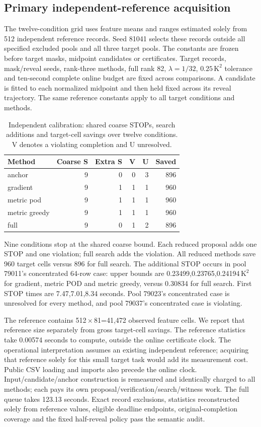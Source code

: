 \subsection{Primary independent-reference acquisition}\label{app:calibration-v81}
The twelve-condition grid uses feature means and ranges estimated solely from 512 independent reference records. Seed 81041 selects these records outside all specified excluded pools and all three target pools. The constants are frozen before target masks, midpoint candidates or certificates. Target records, mask/reveal seeds, rank-three methods, full rank 82, $\lambda=1/32$, $0.25\,\mathrm{K}^2$ tolerance and ten-second complete online budget are fixed across comparisons. A candidate is fitted to each normalized midpoint and then held fixed across its reveal trajectory. The same reference constants apply to all target conditions and methods.

\begin{table}[t]\centering\small\setlength{\tabcolsep}{3pt}
\caption{Independent calibration: shared coarse STOPs, search additions and target-cell savings over twelve conditions. V denotes a violating completion and U unresolved.}\label{tab:calibration-v81}
\begin{tabular}{lrrrrr}\toprule Method&Coarse S&Extra S&V&U&Saved\\\midrule
anchor&9&0&0&3&896\\
gradient&9&1&1&1&960\\
metric pod&9&1&1&1&960\\
metric greedy&9&1&1&1&960\\
full&9&0&1&2&896\\
\bottomrule\end{tabular}\end{table}

Nine conditions stop at the shared coarse bound. Each reduced proposal adds one STOP and one violation; full search adds the violation. All reduced methods save 960 target cells versus 896 for full search. The additional STOP occurs in pool 79011's concentrated 64-row case: upper bounds are 0.23499,0.23765,0.24194\,$\mathrm{K}^2$ for gradient, metric POD and metric greedy, versus 0.30834 for full search. First STOP times are 7.47,7.01,8.34 seconds. Pool 79023's concentrated case is unresolved for every method, and pool 79037's concentrated case is violating. 

The reference contains 512\,$\times$\,81=41,472 observed feature cells. We report that reference size separately from gross target-cell savings. The reference statistics take 0.00574 seconds to compute, outside the online certificate clock. The operational interpretation assumes an existing independent reference; acquiring that reference solely for this small target task would add its measurement cost. Public CSV loading and imports also precede the online clock. Input/candidate/anchor construction is remeasured and identically charged to all methods; each pays its own proposal/verification/search/witness work. The full queue takes 123.13 seconds. Exact record exclusions, statistics reconstructed solely from reference values, eligible deadline endpoints, original-completion coverage and the fixed half-reveal policy pass the semantic audit.
